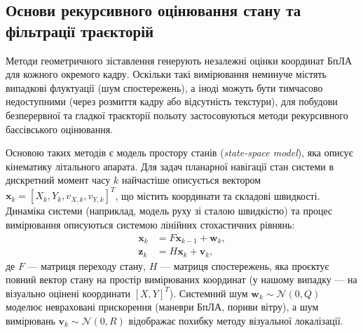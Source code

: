 \documentclass[a4paper, 12pt, titlepage]{article}
\begin{document}
\subsection{Основи рекурсивного оцінювання стану та фільтрації траєкторій}

Методи геометричного зіставлення генерують незалежні оцінки координат БпЛА для кожного окремого кадру. Оскільки такі вимірювання неминуче містять випадкові флуктуації (шум спостережень), а іноді можуть бути тимчасово недоступними (через розмиття кадру або відсутність текстури), для побудови безперервної та гладкої траєкторії польоту застосовуються методи рекурсивного баєсівського оцінювання.

Основою таких методів є модель простору станів (\textit{state-space model}), яка описує кінематику літального апарата. Для задач планарної навігації стан системи в дискретний момент часу $k$ найчастіше описується вектором $\mathbf{x}_k = [X_k, Y_k, v_{X,k}, v_{Y,k}]^T$, що містить координати та складові швидкості. Динаміка системи (наприклад, модель руху зі сталою швидкістю) та процес вимірювання описуються системою лінійних стохастичних рівнянь:
\begin{align}
\mathbf{x}_k &= F \mathbf{x}_{k-1} + \mathbf{w}_k, \\
\mathbf{z}_k &= H \mathbf{x}_k + \mathbf{v}_k,
\end{align}
де $F$ --- матриця переходу стану, $H$ --- матриця спостережень, яка проєктує повний вектор стану на простір вимірюваних координат (у нашому випадку --- на візуально оцінені координати $[X, Y]^T$). Системний шум $\mathbf{w}_k \sim \mathcal{N}(0, Q)$ моделює невраховані прискорення (маневри БпЛА, пориви вітру), а шум вимірювань $\mathbf{v}_k \sim \mathcal{N}(0, R)$ відображає похибку методу візуальної локалізації.
\end{document}
